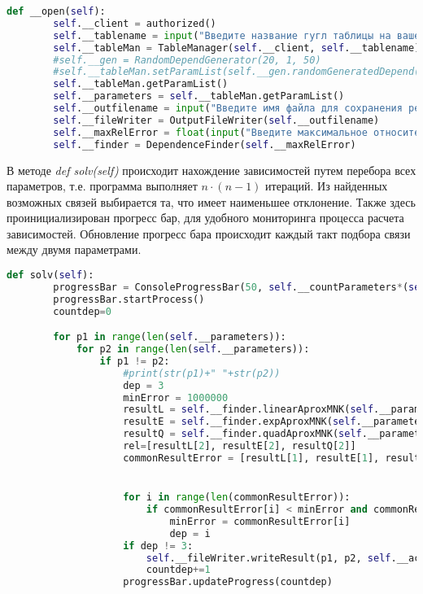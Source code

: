     \begin{lstlisting}[language=Python]
    def __open(self):
        self.__client = authorized()
        self.__tablename = input("Введите название гугл таблицы на вашем аккаунте или url адрес доступной таблицы: ")
        self.__tableMan = TableManager(self.__client, self.__tablename)
        #self.__gen = RandomDependGenerator(20, 1, 50)
        #self.__tableMan.setParamList(self.__gen.randomGeneratedDepend())
        self.__tableMan.getParamList()
        self.__parameters = self.__tableMan.getParamList()
        self.__outfilename = input("Введите имя файла для сохранения результатов: ")
        self.__fileWriter = OutputFileWriter(self.__outfilename)
        self.__maxRelError = float(input("Введите максимальное относительное отклонение в процентах от зависимости: "))/100.0
        self.__finder = DependenceFinder(self.__maxRelError)
    \end{lstlisting}

    В методе \textit{def solv(self)} происходит нахождение зависимостей путем перебора всех параметров, т.е. программа выполняет $n\cdot (n-1)$ итераций. Из найденных возможных связей выбирается та, что имеет наименьшее отклонение. Также здесь проинициализирован прогресс бар, для удобного мониторинга процесса расчета зависимостей.
    Обновление прогресс бара происходит каждый такт подбора связи между двумя параметрами.

    \begin{lstlisting}[language=Python]
    def solv(self):
        progressBar = ConsoleProgressBar(50, self.__countParameters*(self.__countParameters-1))
        progressBar.startProcess()
        countdep=0

        for p1 in range(len(self.__parameters)):
            for p2 in range(len(self.__parameters)):
                if p1 != p2:
                    #print(str(p1)+" "+str(p2))
                    dep = 3
                    minError = 1000000
                    resultL = self.__finder.linearAproxMNK(self.__parameters[p1], self.__parameters[p2])
                    resultE = self.__finder.expAproxMNK(self.__parameters[p1], self.__parameters[p2])
                    resultQ = self.__finder.quadAproxMNK(self.__parameters[p1], self.__parameters[p2])
                    rel=[resultL[2], resultE[2], resultQ[2]]
                    commonResultError = [resultL[1], resultE[1], resultQ[1]]


                    for i in range(len(commonResultError)):
                        if commonResultError[i] < minError and commonResultError[i] < self.__maxRelError and rel[i]:
                            minError = commonResultError[i]
                            dep = i
                    if dep != 3:
                        self.__fileWriter.writeResult(p1, p2, self.__accesDependList[dep])
                        countdep+=1
                    progressBar.updateProgress(countdep)
    \end{lstlisting}


